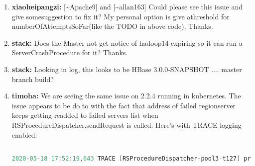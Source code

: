 \documentclass{report}%
\begin{document}
\begin{enumerate}
\begin{lstlisting}[language=java]
\end{lstlisting} \ \newline%
\newline%
master will sendReust to hadoop14 and fails, so it will callscheduleForRetry to retry , and inscheduleForRetry , master will check whether hadoop14 is inonlineServers , if is, retry, hence master will retry forever and print thousands of logs like log \#7.\newline%
\newline%
\newline%
\newline%
%
\item%
\textbf{xiaoheipangzi: }{[}\textasciitilde{}Apache9{]} and {[}\textasciitilde{}allan163{]}\newline%
\newline%
\newline%
\newline%
Could please see this issue and give somesuggestion to fix it?\newline%
\newline%
\newline%
\newline%
My personal option is give athreshold for numberOfAttemptsSoFar(like the TODO in above code).\newline%
\newline%
\newline%
\newline%
Thanks.%
\item%
\textbf{stack: }Does the Master not get notice of hadoop14 expiring so it can run a ServerCrashProcedure for it? Thanks.%
\item%
\textbf{stack: }Looking in log, this looks to be HBase 3.0.0{-}SNAPSHOT .... master branch build?%
\item%
\textbf{timoha: }We are seeing the same issue on 2.2.4 running in kubernetes. The issue appears to be do to with the fact that address of failed regionserver keeps getting readded to failed servers list when RSProcedureDispatcher.sendRequest is called.\newline%
\newline%
\newline%
\newline%
Here's with TRACE logging enabled:\newline%
\newline%
\begin{lstlisting}[language=java]

2020-05-18 17:52:19,643 TRACE [RSProcedureDispatcher-pool3-t127] procedure.RSProcedureDispatcher: Building request with operations count=1


\end{lstlisting}
\end{enumerate}
\end{document}
